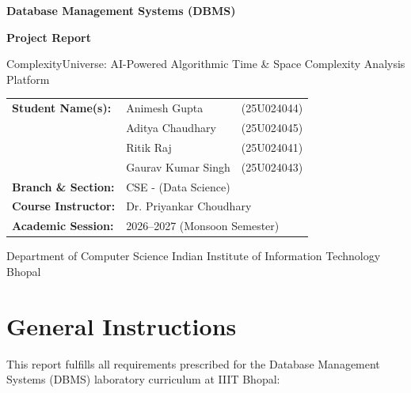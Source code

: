 \documentclass[12pt,a4paper]{report}
\DeclareRobustCommand{\_}{\textunderscore\allowbreak}
\newcommand{\projecttitle}{ComplexityUniverse: AI-Powered Algorithmic Time \& Space Complexity Analysis Platform}
\newcommand{\coursename}{Database Management Systems (DBMS)}
\begin{document}
\begin{titlepage}
    \centering
    \vspace*{1.2cm}
    {\Large \textbf{\coursename}\par}
    \vspace{1.2cm}
    {\Huge \bfseries Project Report\par}
    \vspace{0.6cm}
    {\LARGE \projecttitle\par}
    \vspace{1.5cm}

    \begin{tabular}{>{\bfseries}p{4.5cm} p{5.0cm} p{3.2cm}}
        Student Name(s): & Animesh Gupta & (25U024044) \\
                         & Aditya Chaudhary & (25U024045) \\
                         & Ritik Raj & (25U024041) \\
                         & Gaurav Kumar Singh & (25U024043) \\[0.5cm]
        Branch \& Section: & \multicolumn{2}{l}{CSE - (Data Science)} \\[0.5cm]
        Course Instructor: & \multicolumn{2}{l}{Dr. Priyankar Choudhary} \\[0.5cm]
        Academic Session:  & \multicolumn{2}{l}{2026--2027 (Monsoon Semester)}
    \end{tabular}

    \vfill
    {\large Department of Computer Science}
    \vspace{0.3cm}
    {\large Indian Institute of Information Technology Bhopal}
    \vspace{0.8cm}
\end{titlepage}

\tableofcontents
\clearpage

\chapter*{General Instructions}

This report fulfills all requirements prescribed for the Database Management Systems (DBMS) laboratory curriculum at IIIT Bhopal:
\end{document}
